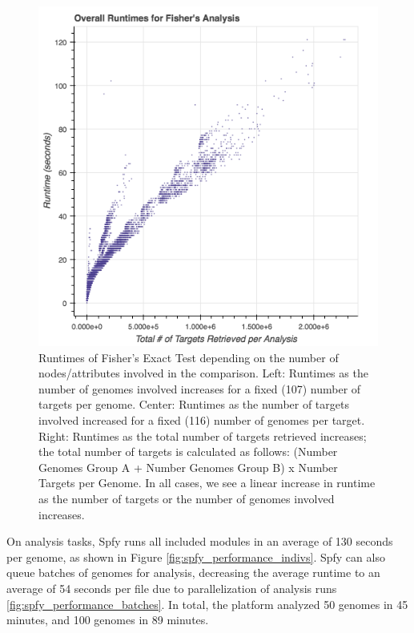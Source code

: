 \documentclass{article}
\begin{document}
\begin{figure}[!htb]
\endminipage\hfill
{}%
  \includegraphics[width=\linewidth]{images/fishers_overall.png}
\endminipage
\caption{Runtimes of Fisher's Exact Test depending on the number of nodes/attributes involved in the comparison. Left: Runtimes as the number of genomes involved increases for a fixed (107) number of targets per genome. Center: Runtimes as the number of targets involved increased for a fixed (116) number of genomes per target. Right: Runtimes as the total number of targets retrieved increases; the total number of targets is calculated as follows: (Number Genomes Group A + Number Genomes Group B) x Number Targets per Genome. In all cases, we see a linear increase in runtime as the number of targets or the number of genomes involved increases.}\label{fig:fishers_performance}
\end{figure}

On analysis tasks, Spfy runs all included modules in an average of 130 seconds per genome, as shown in Figure \ref{fig:spfy_performance_indivs}.
Spfy can also queue batches of genomes for analysis, decreasing the average runtime to an average of 54 seconds per file due to parallelization of analysis runs \ref{fig:spfy_performance_batches}.
In total, the platform analyzed 50 genomes in 45 minutes, and 100 genomes in 89 minutes.

\end{document}
